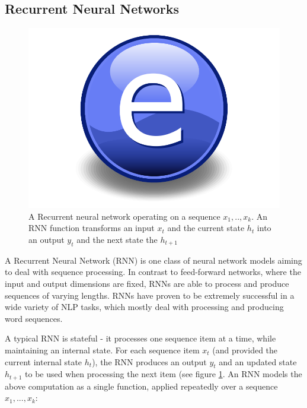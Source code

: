 
\subsection{Recurrent Neural Networks}

\begin{figure}
    \centering
    \includegraphics{Figures/Electron.pdf}
    \caption{A Recurrent neural network operating on a sequence $x_1,..,x_k$. An RNN function transforms an input $x_t$ and the current state $h_t$ into an output $y_t$ and the next state the $h_{t+1}$}
    \label{fig:rnn}
\end{figure}

A Recurrent Neural Network (RNN) is one class of neural network models aiming to deal with sequence processing. In contrast to feed-forward networks, where the input and output dimensions are fixed, RNNs are able to process and produce sequences of varying lengths. RNNs have proven to be extremely successful in a wide variety of NLP tasks, which mostly deal with processing and producing word sequences. 

A typical RNN is stateful - it processes one sequence item at a time, while maintaining an internal state. For each sequence item $x_t$ (and provided the current internal state $h_t$), the RNN produces an output $y_t$ and an updated state $h_{t+1}$ to be used when processing the next item (see figure \ref{fig:rnn}. An RNN models the above computation as a single function, applied repeatedly over a sequence $x_1, ... ,x_k$:

